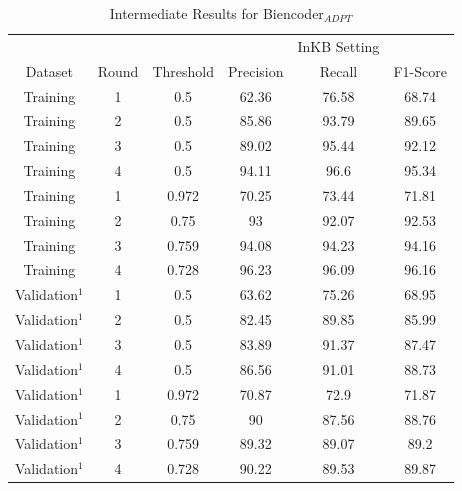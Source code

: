 \documentclass{report}
\theoremstyle{definition}
\theoremstyle{remark}
\begin{document}
\begin{table}[H]
    \vspace{0.5cm}\begin{tabular}{cccccc}
    &&&&InKB Setting & \\
    Dataset & Round    & Threshold& Precision & Recall & F1-Score \\
        \hline
    Training & 1 & 0.5&62.36&76.58&68.74 \\
    Training & 2 & 0.5&85.86&93.79&89.65 \\
    Training & 3 & 0.5&89.02&95.44&92.12 \\
    Training & 4 & 0.5&94.11&96.6&95.34 \\
    \hline
    Training & 1 & 0.972&70.25&73.44&71.81 \\
    Training & 2 & 0.75 &93&92.07&92.53\\
    Training & 3 & 0.759&94.08&94.23&94.16 \\
    Training & 4 & 0.728&96.23&96.09&96.16 \\
    \hline
    Validation$^1$ & 1 & 0.5&63.62&75.26&68.95\\
    Validation$^1$ & 2 & 0.5&82.45&89.85&85.99\\
    Validation$^1$ & 3 & 0.5&83.89&91.37&87.47\\
    Validation$^1$ & 4 & 0.5&86.56&91.01&88.73\\
    \hline
    Validation$^1$ & 1 & 0.972&70.87&72.9&71.87 \\
    Validation$^1$ & 2 & 0.75 &90&87.56&88.76 \\
    Validation$^1$ & 3 & 0.759&89.32&89.07&89.2 \\
    Validation$^1$ & 4 & 0.728&90.22&89.53&89.87 \\
    \end{tabular}
    \caption{Intermediate Results for Biencoder$_{ADPT}$}
    \label{tab:biencoderadaptresapp}
\end{table}
\end{document}
